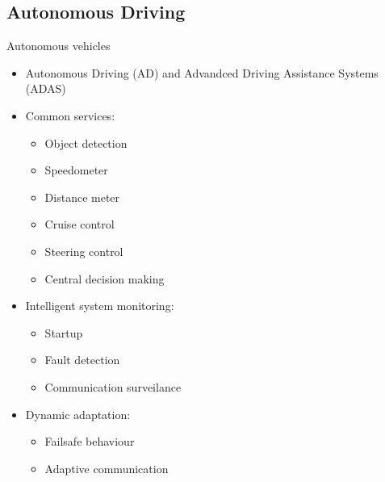 \documentclass{beamer}
\begin{document}
\subsection{Autonomous Driving}
\begin{frame}{Autonomous vehicles}
    \begin{itemize}
        \item Autonomous Driving (AD) and Advandced Driving Assistance Systems (ADAS)
        \item Common services:
            \begin{itemize}
                \item Object detection
                \item Speedometer
                \item Distance meter
                \item Cruise control
                \item Steering control
                \item Central decision making
            \end{itemize}
        \item Intelligent system monitoring:
            \begin{itemize}
                \item Startup
                \item Fault detection
                \item Communication surveilance
            \end{itemize}
        \item Dynamic adaptation:
            \begin{itemize}
                \item Failsafe behaviour
                \item Adaptive communication
            \end{itemize}
    \end{itemize}
\end{frame}


\end{document}
